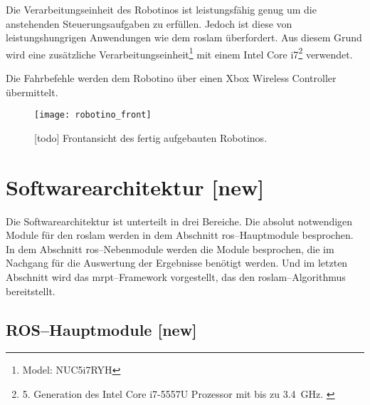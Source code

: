 Die Verarbeitungseinheit des Robotinos ist leistungsfähig genug um die anstehenden Steuerungsaufgaben zu erfüllen. Jedoch ist diese von leistungshungrigen Anwendungen wie dem \Gls{roslam} überfordert. Aus diesem Grund wird eine zusätzliche Verarbeitungseinheit\footnote{Model: NUC5i7RYH} mit einem Intel Core i7\footnote{5. Generation des Intel Core i7-5557U Prozessor mit bis zu \SI{3.4}{\GHz}. \cite{intel2015nucproductbrief}} verwendet.

Die Fahrbefehle werden dem Robotino über einen Xbox Wireless Controller übermittelt.

\begin{figure}[h]
	\centering
	\texttt{[image: robotino\_front]}
	\caption{[todo] Frontansicht des fertig aufgebauten Robotinos.}
	\label{fig:robotino_front}
\end{figure}


\begin{comment}
--------------------------------------------------------------------------------
- Kurzbeschreibung der Modulfunktion
- Welche Funktion erfüllt dieses Modul
- Welche ROS-Messages/-Topics/-Services bietet dieses Modul
\end{comment}
\section{Softwarearchitektur [new]}

Die Softwarearchitektur ist unterteilt in drei Bereiche. Die absolut notwendigen Module für den \Gls{roslam} werden in dem Abschnitt \Gls{ros}--Hauptmodule besprochen. In dem Abschnitt \Gls{ros}--Nebenmodule werden die Module besprochen, die im Nachgang für die Auswertung der Ergebnisse benötigt werden. Und im letzten Abschnitt wird das \Gls{mrpt}--Framework vorgestellt, das den \Gls{roslam}--Algorithmus bereitstellt.


\begin{comment}
--------------------------------------------------------------------------------
- todo: Übersicht über alle Module und deren Verbindung zu einander?
\end{comment}
\subsection{ROS--Hauptmodule [new]}


\begin{comment}
--------------------------------------------------------------------------------
- \url{http://wiki.ros.org/robotino_node}
- todo: Service reset_odometry
\end{comment}
